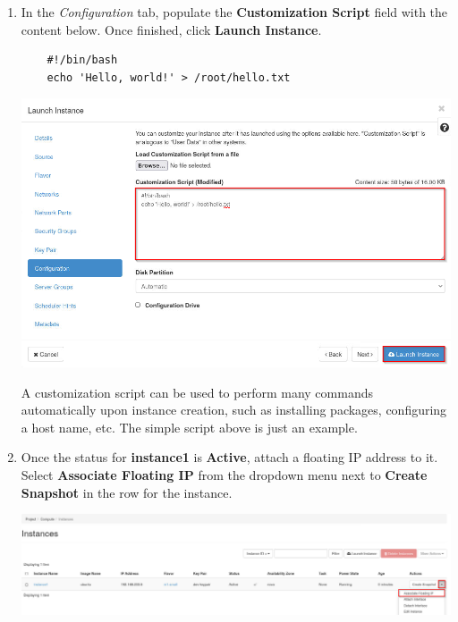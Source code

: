 \documentclass[letterpaper, 12pt]{article}
\begin{document}
\begin{enumerate}
    \item In the \textit{Configuration} tab, populate the \textbf{Customization Script} field with the content below.
    Once finished, click \textbf{Launch Instance}.
    \begin{lstlisting}
    #!/bin/bash
    echo 'Hello, world!' > /root/hello.txt
    \end{lstlisting}

    \begin{center}
        \includegraphics[width=\linewidth]{images/part1/step26.png}
    \end{center}

    \begin{tipbox}
        A customization script can be used to perform many commands automatically upon instance creation, such as
        installing packages, configuring a host name, etc. The simple script above is just an example.
    \end{tipbox}

    \item Once the status for \textbf{instance1} is \textbf{Active}, attach a floating IP address to it. Select
    \textbf{Associate Floating IP} from the dropdown menu next to \textbf{Create Snapshot} in the row for the instance.

    \begin{center}
        \includegraphics[width=\linewidth]{images/part1/step27.png}
    \end{center}


\end{enumerate}
\end{document}

